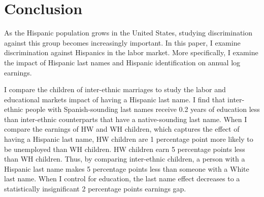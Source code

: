 
\section{Conclusion}\label{sec:con1}

As the Hispanic population grows in the United States, studying discrimination against this group becomes increasingly important. In this paper, I examine discrimination against Hispanics in the labor market. More specifically, I examine the impact of Hispanic last names and Hispanic identification on annual log earnings. 

I compare the children of inter-ethnic marriages to study the labor and educational markets impact of having a Hispanic last name. I find that inter-ethnic people with Spanish-sounding last names receive 0.2 years of education less than inter-ethnic counterparts that have a native-sounding last name. When I compare the earnings of HW and WH children, which captures the effect of having a Hispanic last name, HW children are 1 percentage point more likely to be unemployed than WH children. HW children earn 5 percentage points less than WH children. Thus, by comparing inter-ethnic children, a person with a Hispanic last name makes 5 percentage points less than someone with a White last name. When I control for education, the last name effect decreases to a statistically insignificant 2 percentage points earnings gap. 

